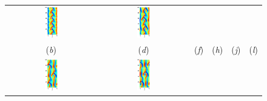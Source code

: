 \begin{figure}[h!t]
\begin{center}
\begin{tabular}{cccccc}
\includegraphics[width=0.15\textwidth]{../figs/ks22rpo020.5-00.00.eps}\hspace{-3ex} &
\includegraphics[width=0.15\textwidth]{../figs/ks22rpo066.8-00.00.eps}\\
(\textit{b}) & (\textit{d}) & (\textit{f}) &
(\textit{h}) & (\textit{j}) & (\textit{l})\\
\includegraphics[width=0.15\textwidth]{../figs/ks22rpo032.8-10.96.eps}\hspace{-3ex} &
\includegraphics[width=0.15\textwidth]{../figs/ks22rpo034.6-09.60.eps}\hspace{-3ex} &

\end{tabular}
\end{center}
\end{figure}
